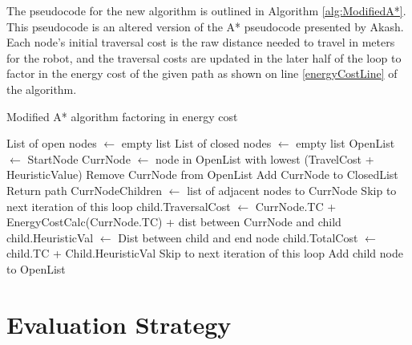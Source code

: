The pseudocode for the new algorithm is outlined in Algorithm \ref{alg:ModifiedA*}. This pseudocode is an altered version of the A* pseudocode presented by Akash\cite{akash_2020}. Each node's initial traversal cost is the raw distance needed to travel in meters for the robot, and the traversal costs are updated in the later half of the loop to factor in the energy cost of the given path as shown on line \ref{energyCostLine} of the algorithm.
\begin{algorithm}[H]
    \footnotesize
    \caption{Modified A* algorithm factoring in energy cost}\label{alg:ModifiedA*}
    \begin{algorithmic}[1]
        \State List of open nodes $\gets$ empty list
        \State List of closed nodes $\gets $ empty list
        \State OpenList $\gets$ StartNode
            \State CurrNode $\gets$ node in OpenList with lowest (TravelCost + HeuristicValue)
            \State Remove CurrNode from OpenList
            \State Add CurrNode to ClosedList
                \State Return path
            \EndIf
            \State CurrNodeChildren $\gets$ list of adjacent nodes to CurrNode
                    \State Skip to next iteration of this loop
                \EndIf
                \State child.TraversalCost $\gets$ CurrNode.TC + EnergyCostCalc(CurrNode.TC) + dist between CurrNode and child \label{energyCostLine}
                \State child.HeuristicVal $\gets$ Dist between child and end node
                \State child.TotalCost $\gets$ child.TC + Child.HeuristicVal
                        \State Skip to next iteration of this loop
                    \EndIf
                \EndIf
                \State Add child node to OpenList
            \EndFor
        \EndWhile
    \end{algorithmic}
\end{algorithm}

\section{Evaluation Strategy}
\label{sec:evaluate}

